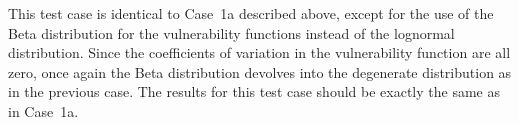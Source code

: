 This test case is identical to Case~1a described above, except for the use of the Beta distribution for the vulnerability functions instead of the lognormal distribution. Since the coefficients of variation in the vulnerability function are all zero, once again the Beta distribution devolves into the degenerate distribution as in the previous case. The results for this test case should be exactly the same as in Case~1a.